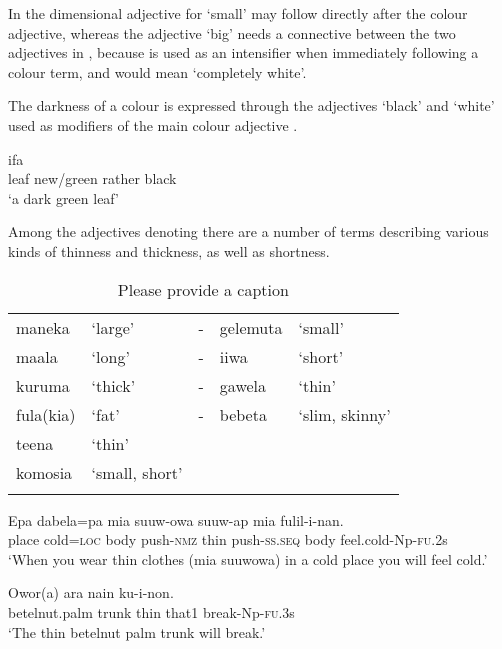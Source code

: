 In  the dimensional adjective for `small' may follow directly after the colour adjective, whereas the adjective  `big' needs a connective between the two adjectives in , because  is used as an intensifier when immediately following a colour term, and  would mean `completely white'.

The darkness of a colour is expressed through the adjectives  `black' and  `white' used as modifiers of the main colour adjective .

\ea%
\label{ex:3:x110}
\gll ifa    \\
leaf new/green rather black\\
\glt`a dark green leaf'
\z

Among the adjectives denoting  there are a number of terms describing various kinds of thinness and thickness, as well as shortness. 

\begin{table}
\caption{Please provide a caption}
\label{} 
\begin{tabular}{llcll}
\mytoprule
maneka &`large' &- &gelemuta &`small'\\
maala &`long' &- &iiwa &`short'\\
kuruma &`thick' &- &gawela &`thin'\\
fula(kia) &`fat' &- &bebeta &`slim, skinny'\\
teena &`thin'&&&\\
komosia &`small, short'&&&\\
\mybottomrule
\end{tabular}
\end{table}

\ea%
\label{ex:3:x1756}
\gll Epa dabela=pa mia suuw-owa  suuw-ap mia fulil-i-nan.\\
place cold=\textsc{loc} body push-\textsc{nmz} thin push-\textsc{ss}.\textsc{seq} body feel.cold-Np-\textsc{fu}.2s\\
\glt`When you wear thin clothes (mia suuwowa) in a cold place you will feel cold.' 
\z

\ea%
\label{ex:3:x76}
\gll Owor(a) ara   nain ku-i-non. \\
betelnut.palm trunk thin that1 break-Np-\textsc{fu}.3s\\
\glt`The thin betelnut palm trunk will break.'
\z

